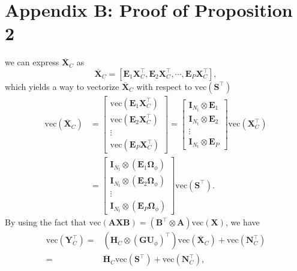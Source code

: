 \section*{Appendix B: Proof of Proposition 2}
\label{app:prop2}
we can express $\overline{\mathbf{X}}_C$ as
\begin{equation}
    \overline{\mathbf{X}}_C = [\mathbf{E}_{1}\mathbf{X}_C^{\top},\mathbf{E}_{2}\mathbf{X}_C^{\top},\cdots,\mathbf{E}_{P}\mathbf{X}_C^{\top}],
\end{equation}
which yields a way to vectorize $\overline{\mathbf{X}}_C$ with respect to $\mathrm{vec}(\mathbf{S}^{\top})$
\begin{equation}
\begin{aligned}
    \mathrm{vec}(\overline{\mathbf{X}}_C) &= 
    \begin{bmatrix}
        \mathrm{vec}(\mathbf{E}_{1}\mathbf{X}_C^{\top}) \\
        \mathrm{vec}(\mathbf{E}_{2}\mathbf{X}_C^{\top}) \\
        \vdots \\
        \mathrm{vec}(\mathbf{E}_{P}\mathbf{X}_C^{\top})
    \end{bmatrix} = 
    \begin{bmatrix}
        \mathbf{I}_{N_t}\otimes\mathbf{E}_{1} \\
        \mathbf{I}_{N_t}\otimes\mathbf{E}_{2} \\
        \vdots \\
        \mathbf{I}_{N_t}\otimes\mathbf{E}_{P}
    \end{bmatrix}\mathrm{vec}(\mathbf{X}_C^{\top}) \\&= 
    \begin{bmatrix}
        \mathbf{I}_{N_t}\otimes(\mathbf{E}_{1}\mathbf{\Omega}_{\phi}) \\
        \mathbf{I}_{N_t}\otimes(\mathbf{E}_{2}\mathbf{\Omega}_{\phi}) \\
        \vdots \\
        \mathbf{I}_{N_t}\otimes(\mathbf{E}_{P}\mathbf{\Omega}_{\phi})
    \end{bmatrix}\mathrm{vec}(\mathbf{S}^{\top}).
\end{aligned}
\end{equation}
By using the fact that $\text{vec}(\mathbf{A}\mathbf{X}\mathbf{B})=(\mathbf{B}^{\top}\otimes\mathbf{A})\text{vec}(\mathbf{X})$, we have
\begin{equation}
\begin{aligned}
    \text{vec}(\mathbf{Y}_C^{\top}) = &(\mathbf{H}_C\otimes(\mathbf{G}\mathbf{U}_{\phi})^{\top})\text{vec}(\overline{\mathbf{X}}_C) + \text{vec}(\mathbf{N}_C^{\top}) \\
    = &\overline{\mathbf{H}}_C\text{vec}(\mathbf{S}^{\top}) + \text{vec}(\mathbf{N}_C^{\top}),
\end{aligned}
\end{equation}

